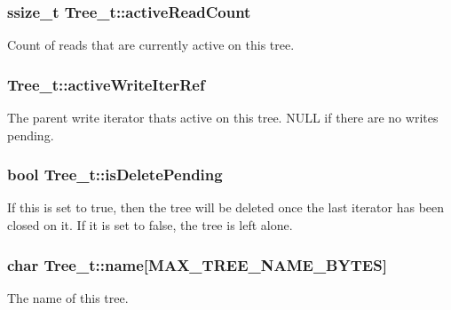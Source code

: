 \subsubsection[{\texorpdfstring{active\+Read\+Count}{activeReadCount}}]{\setlength{\rightskip}{0pt plus 5cm}ssize\+\_\+t Tree\+\_\+t\+::active\+Read\+Count}\hypertarget{struct_tree__t_a8ae16e7f5a746e32de55fd94b84d1c80}{}\label{struct_tree__t_a8ae16e7f5a746e32de55fd94b84d1c80}
Count of reads that are currently active on this tree. 
\subsubsection[{\texorpdfstring{active\+Write\+Iter\+Ref}{activeWriteIterRef}}]{ Tree\+\_\+t\+::active\+Write\+Iter\+Ref}\hypertarget{struct_tree__t_a224d1195c7ebca47df7ff3af94666e8e}{}\label{struct_tree__t_a224d1195c7ebca47df7ff3af94666e8e}
The parent write iterator that\textquotesingle{}s active on this tree. N\+U\+LL if there are no writes pending. 
\subsubsection[{\texorpdfstring{is\+Delete\+Pending}{isDeletePending}}]{\setlength{\rightskip}{0pt plus 5cm}bool Tree\+\_\+t\+::is\+Delete\+Pending}\hypertarget{struct_tree__t_a4d474850df8f2916f08d2df0fc2e19cf}{}\label{struct_tree__t_a4d474850df8f2916f08d2df0fc2e19cf}
If this is set to true, then the tree will be deleted once the last iterator has been closed on it. If it is set to false, the tree is left alone. 
\subsubsection[{\texorpdfstring{name}{name}}]{\setlength{\rightskip}{0pt plus 5cm}char Tree\+\_\+t\+::name\mbox{[}{\bf M\+A\+X\+\_\+\+T\+R\+E\+E\+\_\+\+N\+A\+M\+E\+\_\+\+B\+Y\+T\+ES}\mbox{]}}\hypertarget{struct_tree__t_a03ee247b07de811714b1992b4702ac0a}{}\label{struct_tree__t_a03ee247b07de811714b1992b4702ac0a}


The name of this tree. 

